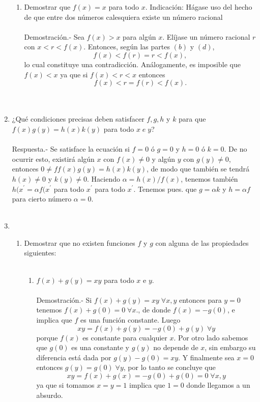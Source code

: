 \begin{enumerate}
\begin{enumerate}[\bfseries (a)]
	    \item Demostrar que $f(x)=x$ para todo $x$. Indicación: Hágase uso del hecho de que entre dos números calesquiera existe un número racional\\\\
		Demostración.-\; Sea $f(x)>x$ para algún $x$. Elíjase un número racional $r$ con $x<r<f(x)$. Entonces, según las partes $(b)$ y $(d)$, $$f(x)<f(r)=r<f(x),$$ 
		lo cual constituye una contradicción. Análogamente, es imposible que $f(x)<x$ ya que si $f(x)<r<x$ entonces $$f(x)<r=f(r)<f(x).$$\\\\

	\end{enumerate}

	\item  ¿Qué condiciones precisas deben satisfacer $f,g,h$ y $k$ para que $f(x)g(y)=h(x)k(y)$ para todo $x \; e \; y$? \\\\
	    Respuesta.-\; Se satisface la ecuación si $f=0$ ó $g=0$ y $h=0$ ó $k=0$. De no ocurrir esto, existirá algún $x$ con $f(x)\neq 0$ y algún $y$ con $g(y)\neq 0$, entonces $0 \neq ff(x)g(y) = h(x)k(y)$, de modo que también se tendrá $h(x) \neq 0$ y $k(y)\neq 0$. Haciendo $\alpha = h(x)/f(x)$, tenemos también $h(x^{'} = \alpha f(x^{'}$ para todo $x^{'}$ para todo $x^{'}$. Tenemos pues. que $g=\alpha k$ y $h=\alpha f$ para cierto número $\alpha=0$. \\\\
	
	\item 

	\begin{enumerate}[\bfseries (a)]

	    \item Demostrar que no existen funciones $f$ y $g$ con alguna de las propiedades siguientes:\\\\

	    \begin{enumerate}[\bfseries (i)]

		\item $f(x)+g(y)=xy$ para todo $x$ e $y$.\\\\
		    Demostración.-\; Si $f(x)+g(y)=xy \; \forall x,y$ entonces para $y=0$ tenemos $f(x)+g(0)=0 \; \forall x.$, de donde $f(x)=-g(0)$, e implica que $f$ es una función constante. Luego $$xy=f(x)+g(y)=-g(0) +g(y)  \; \forall y$$ porque $f(x)$ es constante para cualquier $x$. Por otro lado sabemos que  $g(0)$ es una constante y $g(y)$  no depende de $x$, sin embargo su diferencia está dada por $g(y) - g(0) = xy$. Y finalmente sea $x=0$ entonces $g(y)=g(0) \; \forall y$,  por lo tanto se concluye que $$xy=f(x)+g(x) = -g(0) + g(0) = 0 \; \forall x,y$$  ya que si tomamos $x=y=1$ implica que $1=0$ donde llegamos a un absurdo.\\\\  


\end{enumerate}
\end{enumerate}
\end{enumerate}
